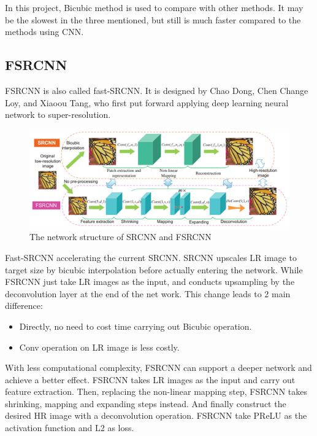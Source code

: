 \documentclass[10pt,twocolumn,letterpaper]{article}
\begin{document}
In this project, Bicubic method is used to compare with other methods.
It may be the slowest in the three mentioned, but still is much faster compared to the methods using CNN.

\subsection{FSRCNN}
FSRCNN\cite{1} is also called fast-SRCNN. 
It is designed by Chao Dong, Chen Change Loy, and Xiaoou Tang, 
who first put forward applying deep learning neural network to super-resolution. 
\begin{figure}[H]
    \centering
    \includegraphics[scale = 0.4]{images/FSRCNN.png}
    \caption{The network structure of SRCNN and FSRCNN}
\end{figure}
Fast-SRCNN accelerating the current SRCNN\cite{6}. 
SRCNN upscales LR image to target size by bicubic interpolation before actually entering the network. 
While FSRCNN just take LR images as the input, and conducts upsampling by the deconvolution layer at the end of the net work. 
This change leads to 2 main difference: 
\begin{itemize}
    \item Directly, no need to cost time carrying out Bicubic operation.
    \item Conv operation on LR image is less costly.
\end{itemize}
With less computational complexity, FSRCNN can support a deeper network and achieve a better effect.
FSRCNN takes LR images as the input and carry out feature extraction. 
Then, replacing the non-linear mapping step, FSRCNN takes shrinking, mapping and expanding steps instead. 
And finally construct the desired HR image with a deconvolution operation. 
FSRCNN take PReLU as the activation function and L2 as loss.
\end{document}
